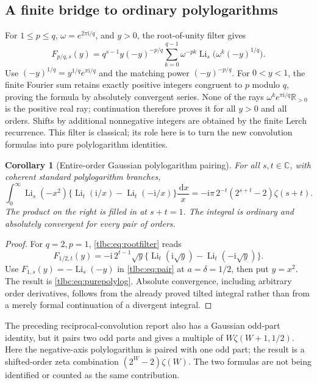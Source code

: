 \documentclass[11pt,letterpaper]{article}
\numberwithin{equation}{section}
\newtheorem{corollary}[theorem]{Corollary}
\theoremstyle{definition}\newtheorem{definition}[theorem]{Definition}
\theoremstyle{remark}\newtheorem{remark}[theorem]{Remark}
\newcommand{\C}{\mathbb C}\newcommand{\R}{\mathbb R}\newcommand{\Q}{\mathbb Q}\newcommand{\Z}{\mathbb Z}
\newcommand{\dd}{\,\mathrm d}\newcommand{\ii}{\mathrm i}
\newcommand{\Li}{\operatorname{Li}}\newcommand{\Rea}{\operatorname{Re}}\newcommand{\Ima}{\operatorname{Im}}
\begin{document}
\subsection{A finite bridge to ordinary polylogarithms}
For $1\le p\le q$, $\omega=e^{2\pi\ii/q}$, and $y>0$, the root-of-unity filter gives
\begin{equation}\label{tlbc:eq:rootfilter}
 F_{p/q,s}(y)=q^{s-1}y(-y)^{-p/q}
       \sum_{k=0}^{q-1}\omega^{-pk}
       \Li_s\bigl(\omega^k(-y)^{1/q}\bigr).
\end{equation}
Use $(-y)^{1/q}=y^{1/q}e^{\pi\ii/q}$ and the matching power $(-y)^{-p/q}$. For $0<y<1$, the finite Fourier sum retains exactly positive integers congruent to $p$ modulo $q$, proving the formula by absolutely convergent series. None of the rays $\omega^ke^{\pi\ii/q}\R_{>0}$ is the positive real ray; continuation therefore proves it for all $y>0$ and all orders. Shifts by additional nonnegative integers are obtained by the finite Lerch recurrence. This filter is classical; its role here is to turn the new convolution formulas into pure polylogarithm identities.

\begin{corollary}[Entire-order Gaussian polylogarithm pairing]\label{tlbc:cor:purepolylog}
For all $s,t\in\C$, with coherent standard polylogarithm branches,
\begin{equation}\label{tlbc:eq:purepolylog}
 \boxed{\displaystyle
 \int_0^\infty\Li_s(-x^2)
       \{\Li_t(\ii/x)-\Li_t(-\ii/x)\}\frac{\dd x}{x}
 =-\ii\pi\,2^{-t}(2^{s+t}-2)\zeta(s+t).}
\end{equation}
The product on the right is filled in at $s+t=1$. The integral is ordinary and absolutely convergent for every pair of orders.
\end{corollary}
\begin{proof}
For $q=2,p=1$, \eqref{tlbc:eq:rootfilter} reads
\[
 F_{1/2,t}(y)=-\ii\,2^{t-1}\sqrt y
       \{\Li_t(\ii\sqrt y)-\Li_t(-\ii\sqrt y)\}.
\]
Use $F_{1,s}(y)=-\Li_s(-y)$ in \eqref{tlbc:eq:pair} at $a=\delta=1/2$, then put $y=x^2$. The result is \eqref{tlbc:eq:purepolylog}. Absolute convergence, including arbitrary order derivatives, follows from the already proved tilted integral rather than from a merely formal continuation of a divergent integral.
\end{proof}
The preceding reciprocal-convolution report also has a Gaussian odd-part identity, but it pairs two odd parts and gives a multiple of $W\zeta(W+1,1/2)$. Here the negative-axis polylogarithm is paired with one odd part; the result is a shifted-order zeta combination $(2^W-2)\zeta(W)$. The two formulas are not being identified or counted as the same contribution.
\end{document}
